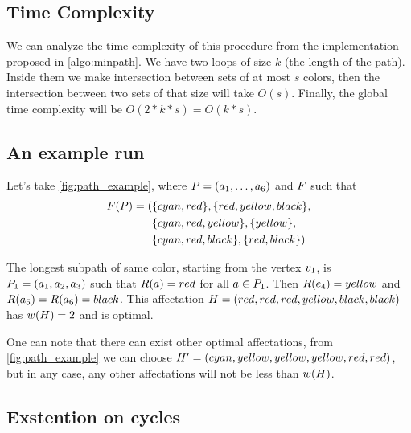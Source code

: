 \subsection{Time Complexity}

We can analyze the time complexity of this procedure from the implementation proposed in \cref{algo:minpath}. We have two loops of size $k$ (the length of the path). Inside them we make intersection between sets of at most $s$ colors, then the intersection between two sets of that size will take $O(s)$. Finally, the global time complexity will be $O(2 * k * s) = O(k*s)$.

\subsection{An example run}
\label{sec:path_ex_run}



Let's take \cref{fig:path_example}, where $P = (a_1,\ldots,a_{6})$ and $F$ such that
\begin{align*}
  F(P) = ( & \{cyan,red\}, \{red,yellow,black\},    \\
                   & \{cyan,red,yellow\}, \{yellow\},    \\
                   & \{cyan,red,black\}, \{red,black\}   )
\end{align*}

The longest subpath of same color, starting from the vertex $v_1$, is $P_1 = (a_1, a_2, a_3)$ such that $R(a) = red$ for all $a \in P_1$. Then $R(e_4) = yellow$ and $R(a_5) = R(a_6) = black$. This affectation $H = (red, red, red, yellow, black, black)$ has $w(H) = 2$ and is optimal.

One can note that there can exist other optimal affectations, from \cref{fig:path_example} we can choose $H' = (cyan, yellow, yellow, yellow, red, red)$, but in any case, any other affectations will not be less than  $w(H)$.

\subsection{Exstention on cycles}

